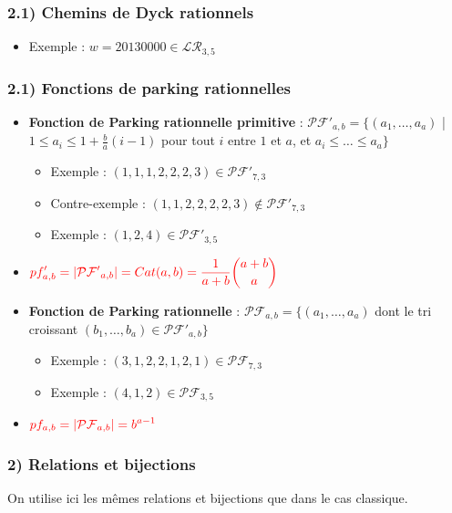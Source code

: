 \documentclass{beamer}
\begin{document}
\begin{frame}
    \frametitle{2.1) Chemins de Dyck rationnels}
    \begin{itemize}
        \item Exemple : $w = 20130000 \in \mathcal{LR}_{3,5}$
    \end{itemize}
    
\end{frame}

\begin{frame}
    \frametitle{2.1) Fonctions de parking rationnelles}
    \begin{itemize}
        \item \textbf{Fonction de Parking rationnelle primitive} :
        $\mathcal{PF'}_{a,b} = \{(a_1, \ldots, a_a)$ | $1 \leqslant a_i
        \leqslant 1 + \frac{b}{a}(i-1)$ pour tout $i$ entre $1$ et $a$,
        et $a_i \leqslant \ldots \leqslant a_a\}$
        \begin{itemize}
            \item Exemple : $(1, 1, 1, 2, 2, 2, 3) \in \mathcal{PF'}_{7,3}$
            \item Contre-exemple : $(1, 1, 2, 2, 2, 2, 3) \not \in
                \mathcal{PF'}_{7,3}$
            \item Exemple : $(1, 2, 4) \in \mathcal{PF'}_{3,5}$
        \end{itemize}
        \item $\color{red}{\displaystyle pf'_{a,b} = |\mathcal{PF'}_{a,b}|
            = Cat(a,b) = \frac{1}{a+b}\binom{a+b}{a}}$
        \item \textbf{Fonction de Parking rationnelle} : $\mathcal{PF}_{a,b}
            = \{(a_1, \ldots, a_a)$ dont le tri croissant $(b_1, \ldots,
            b_a) \in \mathcal{PF'}_{a,b}\}$
        \begin{itemize}
            \item Exemple : $(3, 1, 2, 2, 1, 2, 1) \in \mathcal{PF}_{7,3}$
            \item Exemple : $(4, 1, 2) \in \mathcal{PF}_{3,5}$
        \end{itemize}
        \item $\color{red}{\displaystyle pf_{a,b} = |\mathcal{PF}_{a,b}| =
            b^{a-1}}$
    \end{itemize}
\end{frame}

\begin{frame}
    \frametitle{2) Relations et bijections}
    On utilise ici les mêmes relations et bijections que dans le cas
    classique.
\end{frame}
\end{document}
